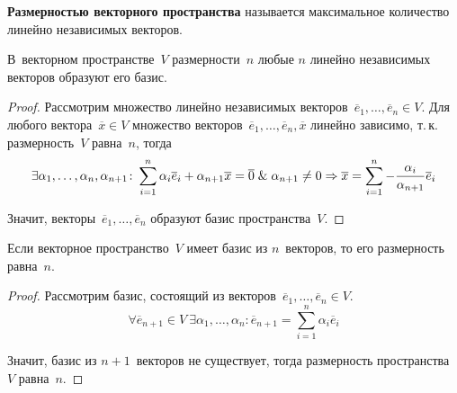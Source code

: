 \textbf{Размерностью векторного пространства} называется максимальное количество линейно независимых векторов.

\begin{theorem}
В~векторном пространстве~$V$ размерности~$n$ любые $n$ линейно независимых векторов образуют его базис.
\end{theorem}
\begin{proof}
Рассмотрим множество линейно независимых векторов~$\overline e_1, \ldots, \overline e_n \in V$.
Для любого вектора~$\overline x \in V$ множество векторов~$\overline e_1, \ldots, \overline e_n, \overline x$ линейно зависимо, т.\,к. размерность~$V$ равна~$n$, тогда
\begin{equation*}
\exists \alpha_1, \ldots, \alpha_n, \alpha_{n+1} \colon
\sum_{i=1}^n \alpha_i \overline e_i + \alpha_{n+1} \overline x = \overline 0 \mathrel{\&} \alpha_{n+1} \neq 0 \Rightarrow
\overline x = \sum_{i=1}^n -\frac{\alpha_i}{\alpha_{n+1}} \overline e_i
\end{equation*}

Значит, векторы~$\overline e_1, \ldots, \overline e_n$ образуют базис пространства~$V$.
\end{proof}

\begin{theorem}
Если векторное пространство~$V$ имеет базис из $n$~векторов, то его размерность равна~$n$.
\end{theorem}
\begin{proof}
Рассмотрим базис, состоящий из векторов~$\overline e_1, \ldots, \overline e_n \in V$.
\begin{equation*}
\forall \overline e_{n+1} \in V \
\exists \alpha_1, \ldots, \alpha_n \colon
\overline e_{n+1} = \sum_{i=1}^n \alpha_i \overline e_i
\end{equation*}

Значит, базис из $n + 1$~векторов не существует, тогда размерность пространства~$V$ равна~$n$.
\end{proof}